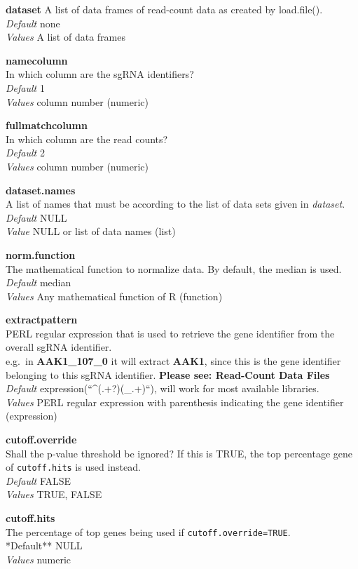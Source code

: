 \documentclass[]{article}
\begin{document}
\textbf{dataset} A list of data frames of read-count data as created by
load.file().\\
\emph{Default} none\\
\emph{Values} A list of data frames

\textbf{namecolumn}\\
In which column are the sgRNA identifiers?\\
\emph{Default} 1\\
\emph{Values} column number (numeric)

\textbf{fullmatchcolumn}\\
In which column are the read counts?\\
\emph{Default} 2\\
\emph{Values} column number (numeric)

\textbf{dataset.names}\\
A list of names that must be according to the list of data sets given in
\emph{dataset}.\\
\emph{Default} NULL\\
\emph{Value} NULL or list of data names (list)

\textbf{norm.function}\\
The mathematical function to normalize data. By default, the median is
used.\\
\emph{Default} median\\
\emph{Values} Any mathematical function of R (function)

\textbf{extractpattern}\\
PERL regular expression that is used to retrieve the gene identifier
from the overall sgRNA identifier.\\
e.g.~in \textbf{AAK1\_107\_0} it will extract \textbf{AAK1}, since this
is the gene identifier belonging to this sgRNA identifier.
\textbf{Please see: Read-Count Data Files}\\
\emph{Default} expression(``\^{}(.+?)(\_.+)``), will work for most
available libraries.\\
\emph{Values} PERL regular expression with parenthesis indicating the
gene identifier (expression)

\textbf{cutoff.override}\\
Shall the p-value threshold be ignored? If this is TRUE, the top
percentage gene of \texttt{cutoff.hits} is used instead.\\
\emph{Default} FALSE\\
\emph{Values} TRUE, FALSE

\textbf{cutoff.hits}\\
The percentage of top genes being used if
\texttt{cutoff.override=TRUE}.\\
*Default** NULL\\
\emph{Values} numeric
\end{document}
